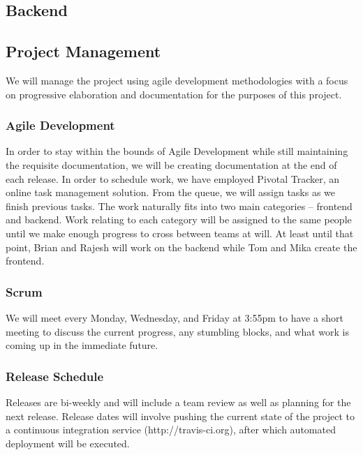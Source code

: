 \documentclass[11pt,letterpaper]{article}
\begin{document}
\subsection{Backend}

\subsection{Project Management}
We will manage the project using agile development methodologies with a focus on progressive elaboration and documentation for the purposes of this project.

\subsubsection{Agile Development}
In order to stay within the bounds of Agile Development while still maintaining the requisite documentation, we will be creating documentation at the end of each release.
In order to schedule work, we have employed Pivotal Tracker, an online task management solution.
From the queue, we will assign tasks as we finish previous tasks.
The work naturally fits into two main categories -- frontend and backend.
Work relating to each category will be assigned to the same people until we make enough progress to cross between teams at will.
At least until that point, Brian and Rajesh will work on the backend while Tom and Mika create the frontend.

\subsubsection{Scrum}
We will meet every Monday, Wednesday, and Friday at 3:55pm to have a short meeting to discuss the current progress, any stumbling blocks, and what work is coming up in the immediate future.

\subsubsection{Release Schedule}
Releases are bi-weekly and will include a team review as well as planning for the next release.
Release dates will involve pushing the current state of the project to a continuous integration service (http://travis-ci.org), after which automated deployment will be executed.
\end{document}
